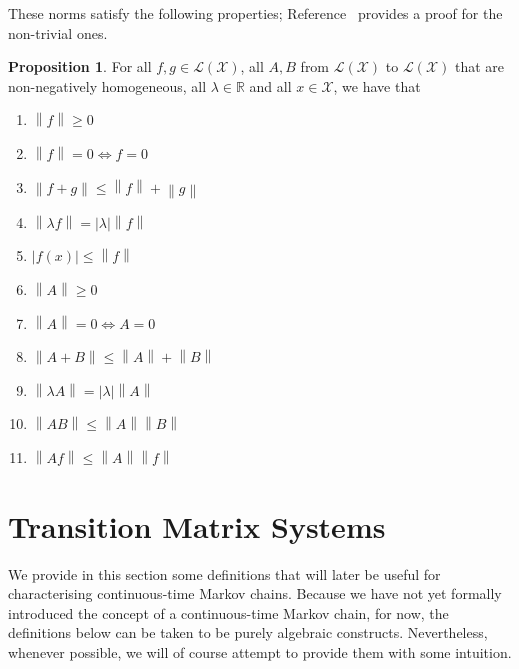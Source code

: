 \documentclass[10pt,a4paper]{paper}
\theoremstyle{definition}
\newtheorem{proposition}[theorem]{Proposition}
\newcommand{\reals}{\mathbb{R}}
\newcommand{\states}{\mathcal{X}}
\newcommand{\gambles}{\mathcal{L}}
\newcommand{\gamblesX}{\gambles(\states)}
\newcommand{\asa}{\Leftrightarrow}
\newcommand{\norm}[1]{\left\lVert #1 \right\rVert}
\newcommand{\abs}[1]{\left\vert #1 \right\vert}
\begin{document}
These norms satisfy the following properties; Reference~\cite{DeBock:2016} provides a proof for the non-trivial ones.

\begin{proposition}\label{prop:norm_properties}
For all $f,g\in\gamblesX$, all $A,B$ from $\gamblesX$ to $\gamblesX$ that are non-negatively homogeneous, all $\lambda\in\reals$ and all $x\in\states$, we have that
\vspace{5pt}

\begin{multicols}{2}
\begin{enumerate}[label=N\arabic*:,ref=N\arabic*]
\item
$\norm{f}\geq0$
\item
$\norm{f}=0\asa f=0$
\item
$\norm{f+g}\leq\norm{f}+\norm{g}$
\item
$\norm{\lambda f}=\abs{\lambda}\norm{f}$
\item
$\abs{f(x)}\leq\norm{f}$ \\
\item
$\norm{A}\geq0$
\item
$\norm{A}=0\asa A=0$
\item
$\norm{A+B}\leq\norm{A}+\norm{B}$
\item\label{N:homogeneous}
$\norm{\lambda A}=\abs{\lambda}\norm{A}$
\item\label{N:normAB}
$\norm{AB}\leq\norm{A}\norm{B}$
\item\label{N:normAf}
$\norm{Af}\leq\norm{A}\norm{f}$
\end{enumerate}
\end{multicols}
\end{proposition}

\section{Transition Matrix Systems}\label{sec:systems}

We provide in this section some definitions that will later be useful for characterising continuous-time Markov chains. Because we have not yet formally introduced the concept of a continuous-time Markov chain, for now, the definitions below can be taken to be purely algebraic constructs. Nevertheless, whenever possible, we will of course attempt to provide them with some intuition.

\end{document}
